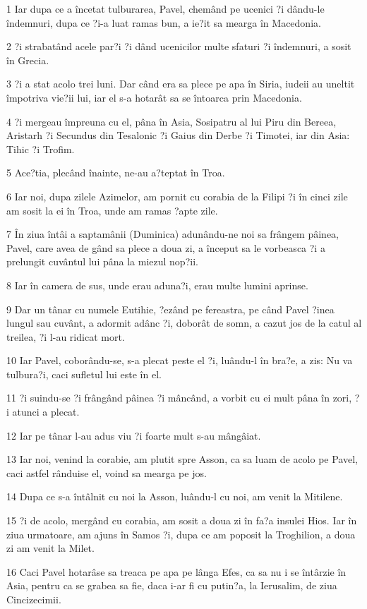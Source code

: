 \par 1 Iar dupa ce a încetat tulburarea, Pavel, chemând pe ucenici ?i dându-le îndemnuri, dupa ce ?i-a luat ramas bun, a ie?it sa mearga în Macedonia.
\par 2 ?i strabatând acele par?i ?i dând ucenicilor multe sfaturi ?i îndemnuri, a sosit în Grecia.
\par 3 ?i a stat acolo trei luni. Dar când era sa plece pe apa în Siria, iudeii au uneltit împotriva vie?ii lui, iar el s-a hotarât sa se întoarca prin Macedonia.
\par 4 ?i mergeau împreuna cu el, pâna în Asia, Sosipatru al lui Piru din Bereea, Aristarh ?i Secundus din Tesalonic ?i Gaius din Derbe ?i Timotei, iar din Asia: Tihic ?i Trofim.
\par 5 Ace?tia, plecând înainte, ne-au a?teptat în Troa.
\par 6 Iar noi, dupa zilele Azimelor, am pornit cu corabia de la Filipi ?i în cinci zile am sosit la ei în Troa, unde am ramas ?apte zile.
\par 7 În ziua întâi a saptamânii (Duminica) adunându-ne noi sa frângem pâinea, Pavel, care avea de gând sa plece a doua zi, a început sa le vorbeasca ?i a prelungit cuvântul lui pâna la miezul nop?ii.
\par 8 Iar în camera de sus, unde erau aduna?i, erau multe lumini aprinse.
\par 9 Dar un tânar cu numele Eutihie, ?ezând pe fereastra, pe când Pavel ?inea lungul sau cuvânt, a adormit adânc ?i, doborât de somn, a cazut jos de la catul al treilea, ?i l-au ridicat mort.
\par 10 Iar Pavel, coborându-se, s-a plecat peste el ?i, luându-l în bra?e, a zis: Nu va tulbura?i, caci sufletul lui este în el.
\par 11 ?i suindu-se ?i frângând pâinea ?i mâncând, a vorbit cu ei mult pâna în zori, ?i atunci a plecat.
\par 12 Iar pe tânar l-au adus viu ?i foarte mult s-au mângâiat.
\par 13 Iar noi, venind la corabie, am plutit spre Asson, ca sa luam de acolo pe Pavel, caci astfel rânduise el, voind sa mearga pe jos.
\par 14 Dupa ce s-a întâlnit cu noi la Asson, luându-l cu noi, am venit la Mitilene.
\par 15 ?i de acolo, mergând cu corabia, am sosit a doua zi în fa?a insulei Hios. Iar în ziua urmatoare, am ajuns în Samos ?i, dupa ce am poposit la Troghilion, a doua zi am venit la Milet.
\par 16 Caci Pavel hotarâse sa treaca pe apa pe lânga Efes, ca sa nu i se întârzie în Asia, pentru ca se grabea sa fie, daca i-ar fi cu putin?a, la Ierusalim, de ziua Cincizecimii.
